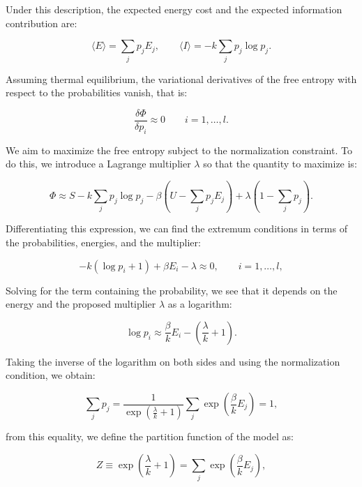 \documentclass[12pt]{article}
\begin{document}
Under this description, the expected energy cost and the expected information contribution are:

\begin{equation}
\langle E \rangle = \sum_j p_j E_j, \qquad  
\langle I \rangle = -k \sum_j p_j \log p_j.
\end{equation}

Assuming thermal equilibrium, the variational derivatives of the free entropy with respect to the probabilities vanish, that is:

\begin{equation}
\frac{\delta \Phi}{\delta p_i} \approx 0 \qquad i = 1, \dots, l  .
\end{equation}

We aim to maximize the free entropy subject to the normalization constraint. To do this, we introduce a Lagrange multiplier $\lambda$ so that the quantity to maximize is:

\begin{equation}
\Phi \approx S - k \sum_j p_j \log p_j - \beta \left(U - \sum_j p_j E_j \right) + \lambda \left(1 - \sum_j p_j \right).
\end{equation}

Differentiating this expression, we can find the extremum conditions in terms of the probabilities, energies, and the multiplier:

\begin{equation}
-k (\log p_i + 1) + \beta E_i - \lambda \approx 0, \qquad i = 1, \dots, l,
\end{equation}

Solving for the term containing the probability, we see that it depends on the energy and the proposed multiplier $\lambda$ as a logarithm:

\begin{equation}
\log p_i \approx \frac{\beta}{k} E_i - \left(\frac{\lambda}{k} + 1\right)  .
\end{equation}

Taking the inverse of the logarithm on both sides and using the normalization condition, we obtain:

\begin{equation}
\sum_j p_j = \frac{1}{\exp(\frac{\lambda}{k} + 1)} \sum_j \exp\left(\frac{\beta}{k} E_j\right) = 1,
\end{equation}

from this equality, we define the partition function of the model as:

\begin{equation}
Z \equiv \exp\left(\frac{\lambda}{k} + 1\right) = \sum_j \exp\left(\frac{\beta}{k} E_j\right),
\end{equation}
\end{document}
